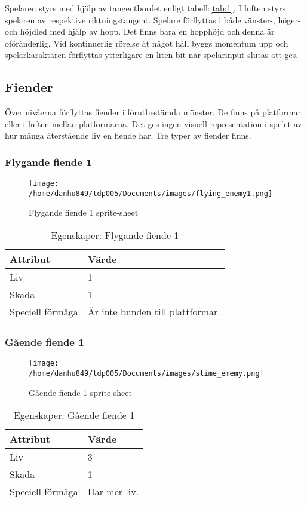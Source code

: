 \documentclass{TDP005mall}
\begin{document}
Spelaren styrs med hjälp av tangentbordet enligt tabell:\ref{tab:1}. I luften styrs spelaren av respektive riktningstangent. Spelare förflyttas i både vänster-, höger- och höjdled med hjälp av hopp. Det finns bara en hopphöjd och denna är oföränderlig. Vid kontinuerlig rörelse åt något håll byggs momentum upp och spelarkaraktären förflyttas ytterligare en liten bit när spelarinput slutas att ges.

\subsection{Fiender}
Över nivåerna förflyttas fiender i förutbestämda mönster. De finns på platformar eller i luften mellan platformarna. Det ges ingen visuell representation i spelet av hur många återstående liv en fiende har. Tre typer av fiender finns.

\subsubsection*{Flygande fiende 1}
\begin{figure}[h!]
  \caption{Flygande fiende 1 sprite-sheet\label{fig:1}}
  \centerline{\texttt{[image: /home/danhu849/tdp005/Documents/images/flying\_enemy1.png]}}
\end{figure}

\begin{table}[h!]
  \centering
  \caption{Egenskaper: Flygande fiende 1\label{tab:2}}
\begin{tabular}{|l|l|}
\hline
Attribut & Värde \\\hline
Liv & 1 \\\hline
Skada & 1 \\\hline
Speciell förmåga & Är inte bunden till plattformar. \\\hline
\end{tabular}
\end{table}
\subsubsection*{Gående fiende 1}
\begin{figure}[h!]
  \centerline{\texttt{[image: /home/danhu849/tdp005/Documents/images/slime\_ememy.png]}}
  \caption{Gående fiende 1 sprite-sheet\label{fig:2}}
\end{figure}

\begin{table}[h!]
  \centering
  \caption{Egenskaper: Gående fiende 1\label{tab:3}}
\begin{tabular}{|l|l|}
\hline
Attribut & Värde \\\hline
Liv & 3 \\\hline
Skada & 1 \\\hline
Speciell förmåga & Har mer liv. \\\hline
\end{tabular}
\end{table}
\end{document}
